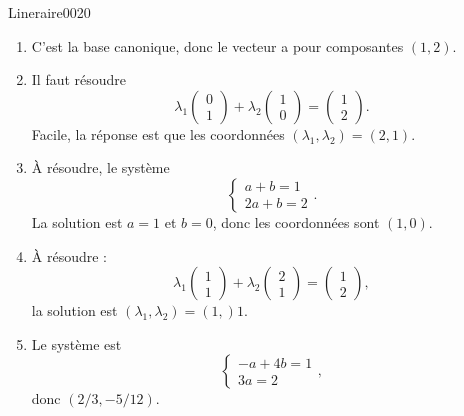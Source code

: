 \begin{corrige}{Lineraire0020}

	\begin{enumerate}

		\item
			C'est la base canonique, donc le vecteur a pour composantes $(1,2)$.

		\item
			Il faut résoudre
			\begin{equation}
				\lambda_1\begin{pmatrix}
					0	\\ 
					1	
				\end{pmatrix}+\lambda_2
				\begin{pmatrix}
					1	\\ 
					0	
				\end{pmatrix}=\begin{pmatrix}
					1	\\ 
					2	
				\end{pmatrix}.
			\end{equation}
			Facile, la réponse est que les coordonnées $(\lambda_1,\lambda_2)=(2,1)$.
		\item
			À résoudre, le système
			\begin{equation}
				\left\{
				\begin{array}{ll}
					a+b=1\\
					2a+b=2
				\end{array}
				\right..
			\end{equation}
			La solution est $a=1$ et $b=0$, donc les coordonnées sont $(1,0)$.

		\item
			À résoudre :
			\begin{equation}
				\lambda_1\begin{pmatrix}
					1	\\ 
					1	
				\end{pmatrix}+\lambda_2\begin{pmatrix}
					2	\\ 
					1	
				\end{pmatrix}=\begin{pmatrix}
					1	\\ 
					2	
				\end{pmatrix},
			\end{equation}
			la solution est $(\lambda_1,\lambda_2)=(1,)1$.

		\item
			Le système est
			\begin{equation}
				\left\{
				\begin{array}{ll}
					-a+4b=1\\
					3a=2
				\end{array}
				\right.,
			\end{equation}
			donc $(2/3,-5/12)$.

	\end{enumerate}
	

\end{corrige}
